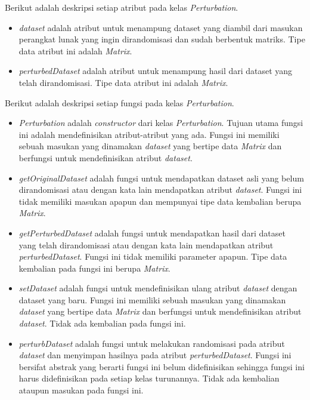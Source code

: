 Berikut adalah deskripsi setiap atribut pada kelas \textit{Perturbation}.
\begin{itemize}
	\item \textit{dataset} adalah atribut untuk menampung dataset yang diambil dari masukan perangkat lunak yang ingin dirandomisasi dan sudah berbentuk matriks. Tipe data atribut ini adalah \textit{Matrix}.
	\item \textit{perturbedDataset} adalah atribut untuk menampung hasil dari dataset yang telah dirandomisasi. Tipe data atribut ini adalah \textit{Matrix}.
\end{itemize}

Berikut adalah deskripsi setiap fungsi pada kelas \textit{Perturbation}.
\begin{itemize}
	\item \textit{Perturbation} adalah \textit{constructor} dari kelas \textit{Perturbation}. Tujuan utama fungsi ini adalah mendefinisikan atribut-atribut yang ada. Fungsi ini memiliki sebuah masukan yang dinamakan \textit{dataset} yang bertipe data \textit{Matrix} dan berfungsi untuk mendefinisikan atribut \textit{dataset}.
	\item \textit{getOriginalDataset} adalah fungsi untuk mendapatkan dataset asli yang belum dirandomisasi atau dengan kata lain mendapatkan atribut \textit{dataset}. Fungsi ini tidak memiliki masukan apapun dan mempunyai tipe data kembalian berupa \textit{Matrix}.
	\item \textit{getPerturbedDataset} adalah fungsi untuk mendapatkan hasil dari dataset yang telah dirandomisasi atau dengan kata lain mendapatkan atribut \textit{perturbedDataset}. Fungsi ini tidak memiliki parameter apapun. Tipe data kembalian pada fungsi ini berupa \textit{Matrix}.
	\item \textit{setDataset} adalah fungsi untuk mendefinisikan ulang atribut \textit{dataset} dengan dataset yang baru. Fungsi ini memiliki sebuah masukan yang dinamakan \textit{dataset} yang bertipe data \textit{Matrix} dan berfungsi untuk mendefinisikan atribut \textit{dataset}. Tidak ada kembalian pada fungsi ini.
	\item \textit{perturbDataset} adalah fungsi untuk melakukan randomisasi pada atribut \textit{dataset} dan menyimpan hasilnya pada atribut \textit{perturbedDataset}. Fungsi ini bersifat abstrak yang berarti fungsi ini belum didefinisikan sehingga fungsi ini harus didefinisikan pada setiap kelas turunannya. Tidak ada kembalian ataupun masukan pada fungsi ini.
\end{itemize}

